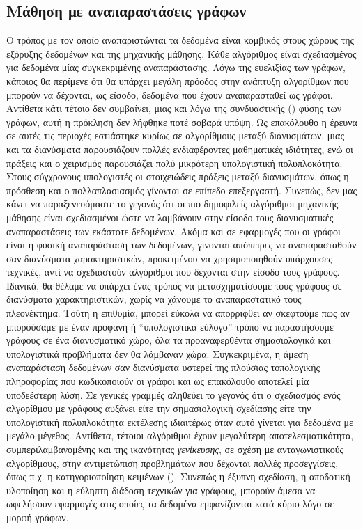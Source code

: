 \subsection{Μάθηση με αναπαραστάσεις γράφων}
Ο τρόπος με τον οποίο αναπαριστώνται τα δεδομένα είναι κομβικός στους χώρους της εξόρυξης δεδομένων και της μηχανικής μάθησης.
Κάθε αλγόριθμος είναι σχεδιασμένος για δεδομένα μίας συγκεκριμένης αναπαράστασης.
Λόγω της ευελιξίας των γράφων, κάποιος θα περίμενε ότι θα υπάρχει μεγάλη πρόοδος στην ανάπτυξη αλγορίθμων που μπορούν να δέχονται, ως είσοδο, δεδομένα που έχουν αναπαρασταθεί ως γράφοι.
Αντίθετα κάτι τέτοιο δεν συμβαίνει, μιας και λόγω της συνδυαστικής () φύσης των γράφων, αυτή η πρόκληση δεν λήφθηκε ποτέ σοβαρά υπόψη.
Ως επακόλουθο η έρευνα σε αυτές τις περιοχές εστιάστηκε κυρίως σε αλγορίθμους μεταξύ διανυσμάτων, μιας και τα διανύσματα παρουσιάζουν πολλές ενδιαφέροντες μαθηματικές ιδιότητες, ενώ οι πράξεις και ο χειρισμός παρουσιάζει πολύ μικρότερη υπολογιστική πολυπλοκότητα. Στους σύγχρονους υπολογιστές οι στοιχειώδεις πράξεις μεταξύ διανυσμάτων, όπως η πρόσθεση και ο πολλαπλασιασμός γίνονται σε επίπεδο επεξεργαστή.
Συνεπώς, δεν μας κάνει να παραξενευόμαστε το γεγονός ότι οι πιο δημοφιλείς αλγόριθμοι μηχανικής μάθησης είναι σχεδιασμένοι ώστε να λαμβάνουν στην είσοδο τους διανυσματικές αναπαραστάσεις των εκάστοτε δεδομένων. 
Ακόμα και σε εφαρμογές που οι γράφοι είναι η φυσική αναπαράσταση των δεδομένων, γίνονται απόπειρες να αναπαρασταθούν σαν διανύσματα χαρακτηριστικών, προκειμένου να χρησιμοποιηθούν υπάρχουσες τεχνικές, αντί να σχεδιαστούν αλγόριθμοι που δέχονται στην είσοδο τους γράφους.
Ιδανικά, θα θέλαμε να υπάρχει ένας τρόπος να μετασχηματίσουμε τους γράφους σε διανύσματα χαρακτηριστικών, χωρίς να χάνουμε το αναπαραστατικό τους πλεονέκτημα.
Τούτη η επιθυμία, μπορεί εύκολα να απορριφθεί αν σκεφτούμε πως αν μπορούσαμε με έναν προφανή ή ``υπολογιστικά εύλογο'' τρόπο να παραστήσουμε γράφους σε ένα διανυσματικό χώρο, όλα τα προαναφερθέντα σημασιολογικά και υπολογιστικά προβλήματα δεν θα λάμβαναν χώρα.
Συγκεκριμένα, η άμεση αναπαράσταση δεδομένων σαν διανύσματα υστερεί της πλούσιας τοπολογικής πληροφορίας που κωδικοποιούν οι γράφοι και ως επακόλουθο αποτελεί μία υποδεέστερη λύση.
Σε γενικές γραμμές αληθεύει το γεγονός ότι ο σχεδιασμός ενός αλγορίθμου με γράφους αυξάνει είτε την σημασιολογική σχεδίασης είτε την υπολογιστική πολυπλοκότητα εκτέλεσης ιδιαιτέρως όταν αυτό γίνεται για δεδομένα με μεγάλο μέγεθος.
Αντίθετα, τέτοιοι αλγόριθμοι έχουν μεγαλύτερη αποτελεσματικότητα, συμπεριλαμβανομένης και της ικανότητας \textit{γενίκευσης}, σε σχέση με ανταγωνιστικούς αλγορίθμους, στην αντιμετώπιση προβλημάτων που δέχονται πολλές προσεγγίσεις, όπως π.χ. η κατηγοριοποίηση κειμένων ().
Συνεπώς η έξυπνη σχεδίαση, η αποδοτική υλοποίηση και η εύληπτη διάδοση τεχνικών για γράφους, μπορούν άμεσα να ωφελήσουν εφαρμογές στις οποίες τα δεδομένα εμφανίζονται κατά κύριο λόγο σε μορφή γράφων.

